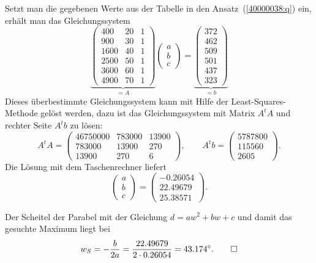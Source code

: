 \begin{loesung}
\begin{teilaufgaben}
\item
Setzt man die gegebenen Werte aus der Tabelle in den Ansatz~(\ref{40000038:q})
ein, erhält man das Gleichungssystem
\[
\underbrace{
\begin{pmatrix}
 400&20&1\\
 900&30&1\\
1600&40&1\\
2500&50&1\\
3600&60&1\\
4900&70&1
\end{pmatrix}}_{\displaystyle = A}
\begin{pmatrix}
a\\
b\\
c
\end{pmatrix}
=
\underbrace{
\begin{pmatrix}
372\\
462\\
509\\
501\\
437\\
323
\end{pmatrix}}_{\displaystyle = b}
\]
Dieses überbestimmte Gleichungssystem kann mit Hilfe der
Least-Squares-Methode gelöst werden, dazu ist das Gleichungssystem
mit Matrix $A^tA$ und rechter Seite $A^tb$ zu lösen:
\[
A^tA
=
\begin{pmatrix}
46750000&783000&13900\\
  783000& 13900&  270\\
   13900&   270&    6
\end{pmatrix},
\qquad
A^tb
=
\begin{pmatrix}
5787800\\
 115560\\
   2605
\end{pmatrix}.
\]
Die Lösung mit dem Taschenrechner liefert
\[
\begin{pmatrix}
a\\b\\c
\end{pmatrix}
=
\begin{pmatrix}
-0.26054\\
22.49679\\
25.38571
\end{pmatrix}.
\]
\item
Der Scheitel der Parabel mit der Gleichung $d=aw^2 + bw+c$
und damit das gesuchte Maximum liegt bei
\[
w_S=-\frac{b}{2a}=\frac{22.49679}{2\cdot 0.26054}=43.174^\circ.
\qedhere
\]
\end{teilaufgaben}
\end{loesung}

